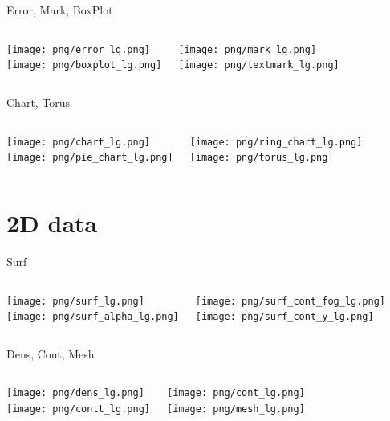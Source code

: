 \documentclass[color=usenames]{beamer}
\begin{document}
\begin{frame}{Error, Mark, BoxPlot}
\begin{columns}
\texttt{[image: png/error\_lg.png]}\\
\texttt{[image: png/boxplot\_lg.png]}

\texttt{[image: png/mark\_lg.png]}\\
\texttt{[image: png/textmark\_lg.png]}

\end{columns}
\end{frame}

\begin{frame}{Chart, Torus}
\begin{columns}
\texttt{[image: png/chart\_lg.png]}\\
\texttt{[image: png/pie\_chart\_lg.png]}

\texttt{[image: png/ring\_chart\_lg.png]}\\
\texttt{[image: png/torus\_lg.png]}

\end{columns}
\end{frame}


\section{2D data}

\begin{frame}{Surf}
\begin{columns}
\texttt{[image: png/surf\_lg.png]}\\
\texttt{[image: png/surf\_alpha\_lg.png]}

\texttt{[image: png/surf\_cont\_fog\_lg.png]}\\
\texttt{[image: png/surf\_cont\_y\_lg.png]}

\end{columns}
\end{frame}

\begin{frame}{Dens, Cont, Mesh}
\begin{columns}
\texttt{[image: png/dens\_lg.png]}\\
\texttt{[image: png/contt\_lg.png]}

\texttt{[image: png/cont\_lg.png]}\\
\texttt{[image: png/mesh\_lg.png]}

\end{columns}
\end{frame}
\end{document}
